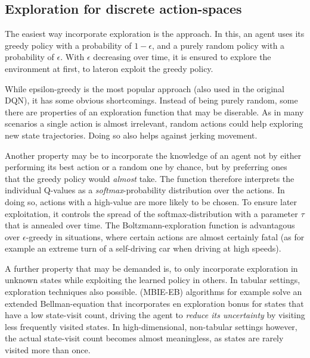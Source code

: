 
\subsection{Exploration for discrete action-spaces}

The easiest way incorporate exploration is the  approach. In this, an agent uses its greedy policy with a probability of $1-\epsilon$, and a purely random policy with a probability of $\epsilon$. With $\epsilon$ decreasing over time, it is ensured to explore the environment at first, to lateron exploit the greedy policy. 

While epsilon-greedy is the most popular approach (also used in the original DQN), it has some obvious shortcomings. Instead of being purely random, some there are properties of an exploration function that may be diserable. As in many scenarios a single action is almost irrelevant,  random actions could help exploring new state trajectories. Doing so also helps against jerking movement. 

Another property may be to incorporate the knowledge of an agent not by either performing its best action or a random one by chance, but by preferring ones that the greedy policy would \textit{almost} take. The  function therefore interprets the individual Q-values as a \textit{softmax}-probability distribution over the actions. In doing so, actions with a high-value are more likely to be chosen. To ensure later exploitation, it controls the spread of the softmax-distribution with a parameter $\tau$ that is annealed over time. The Boltzmann-exploration function is advantagous over $\epsilon$-greedy in situations, where certain actions are almost certainly fatal (as for example an extreme turn of a self-driving car when driving at high speeds).

A further property that may be demanded is, to only incorporate exploration in unknown states while exploiting the learned policy in others. In tabular settings,  exploration techniques also possible.  (MBIE-EB) algorithms for example solve an extended Bellman-equation that incorporates en exploration bonus for states that have a low state-visit count, driving the agent to \textit{reduce its uncertainty} by visiting less frequently visited states. In high-dimensional, non-tabular settings however, the actual state-visit count becomes almost meaningless, as states are rarely visited more than once.

